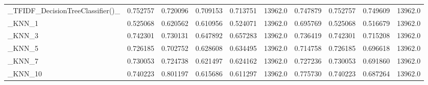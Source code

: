 \begin{tabular}{lrrrrrrrrr}
\_TFIDF\_DecisionTreeClassifier()\_                   &  0.752757 &         0.720096 &      0.709153 &        0.713751 &        13962.0 &            0.747879 &         0.752757 &           0.749609 &           13962.0 \\
\_KNN\_1                                             &  0.525068 &         0.620562 &      0.610956 &        0.524071 &        13962.0 &            0.695769 &         0.525068 &           0.516679 &           13962.0 \\
\_KNN\_3                                             &  0.742301 &         0.730131 &      0.647892 &        0.657283 &        13962.0 &            0.736419 &         0.742301 &           0.715208 &           13962.0 \\
\_KNN\_5                                             &  0.726185 &         0.702752 &      0.628608 &        0.634495 &        13962.0 &            0.714758 &         0.726185 &           0.696618 &           13962.0 \\
\_KNN\_7                                             &  0.730053 &         0.724738 &      0.621497 &        0.624162 &        13962.0 &            0.727236 &         0.730053 &           0.691860 &           13962.0 \\
\_KNN\_10                                            &  0.740223 &         0.801197 &      0.615686 &        0.611297 &        13962.0 &            0.775730 &         0.740223 &           0.687264 &           13962.0 \\
\bottomrule
\end{tabular}
